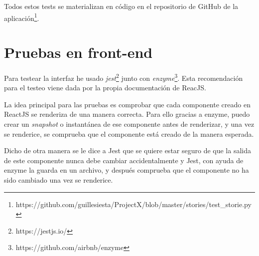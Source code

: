 Todos estos tests se materializan en código en el repositorio de GitHub de la aplicación\footnote{https://github.com/guillesiesta/ProjectX/blob/master/stories/test\_storie.py}. 

\section{Pruebas en front-end}

Para testear la interfaz he usado \textit{jest}\footnote{https://jestjs.io/} junto con \textit{enzyme}\footnote{https://github.com/airbnb/enzyme}. Esta recomendación para el testeo viene dada por la propia documentación de ReacJS\cite{testreact}.

La idea principal para las pruebas es comprobar que cada componente creado en ReactJS se renderiza de una manera correcta. Para ello gracias a enzyme, puedo crear un \textit{snapshot} o instantánea de ese componente antes de renderizar, y una vez se renderice, se comprueba que el componente está creado de la manera esperada\cite{testreact2}.

Dicho de otra manera se le dice a Jest que se quiere estar seguro de que la salida de este componente nunca debe cambiar accidentalmente y Jest, con ayuda de enzyme la guarda en un archivo, y después comprueba que el componente no ha sido cambiado una vez se renderice.